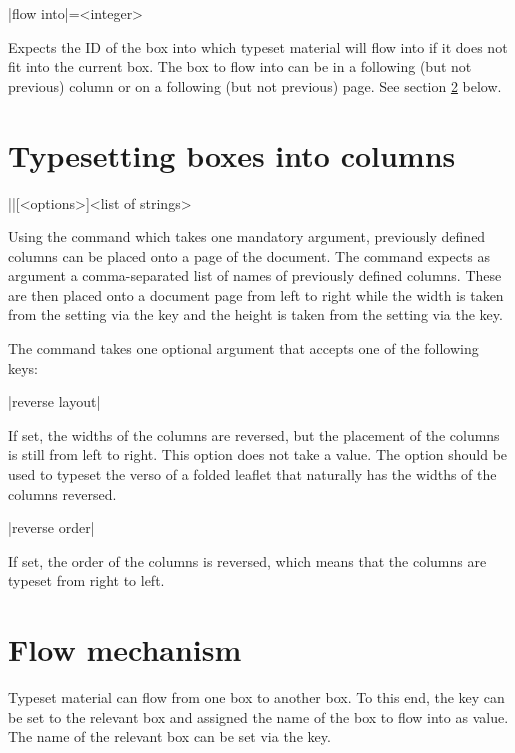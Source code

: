 \documentclass[a4paper]{article}
\begin{document}
\begin{macrodef}
|flow into|={<integer>}
\end{macrodef}
Expects the ID of the box into which typeset material will flow into if it does not fit into the current box. The box to flow into can be in a following (but not previous) column or on a following (but not previous) page. See section \ref{sec:flow} below.

\section{Typesetting boxes into columns}

\begin{macrodef}
|\leporellotypesetcolumns|[<options>]{<list of strings>}
\end{macrodef}
Using the command \macro{\leporellotypesetcolumns} which takes one mandatory argument, previously defined columns can be placed onto a page of the document. The command expects as argument a comma-separated list of names of previously defined columns. These are then placed onto a document page from left to right while the width is taken from the setting via the  key and the height is taken from the setting via the  key.

The command takes one optional argument that accepts one of the following keys:

\begin{macrodef}
|reverse layout|
\end{macrodef}
If set, the widths of the columns are reversed, but the placement of the columns is still from left to right. This option does not take a value. The option should be used to typeset the verso of a folded leaflet that naturally has the widths of the columns reversed.

\begin{macrodef}
|reverse order|
\end{macrodef}
If set, the order of the columns is reversed, which means that the columns are typeset from right to left.

\section{Flow mechanism}\label{sec:flow}

Typeset material can flow from one box to another box. To this end, the key  can be set to the relevant box and assigned the name of the box to flow into as value. The name of the relevant box can be set via the  key.
\end{document}

